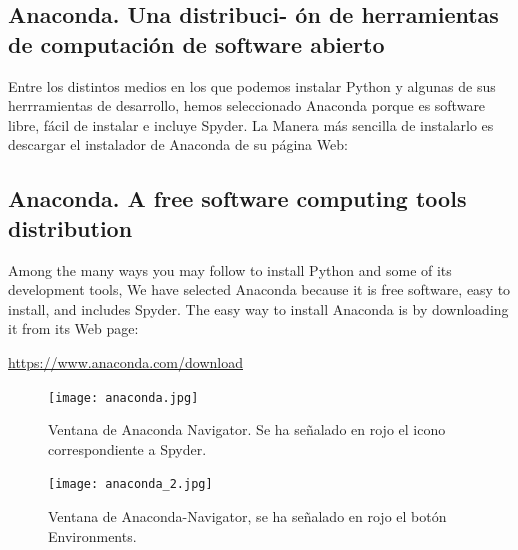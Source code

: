 \begin{paracol}{2}
\subsection{Anaconda. Una distribuci- ón de herramientas de com\-putación de software abierto}
Entre los distintos medios en los que podemos instalar Python y algunas de sus herrramientas de desarrollo, hemos seleccionado Anaconda porque es software libre, fácil de instalar e incluye Spyder. La Manera más sencilla de instalarlo es descargar el instalador de Anaconda de su página Web: 
\switchcolumn
\subsection{Anaconda. A free software computing tools distribution}
Among the many ways you may follow to install Python and some of its development tools, We have selected Anaconda because it is free software, easy to install, and includes Spyder. The easy way to install Anaconda is by downloading it from its Web page:  
\end{paracol}
\begin{center}
    \hyperlink{https://www.anaconda.com/download}{https://www.anaconda.com/download}
\end{center}

\begin{figure}[h]
    \centering
    \texttt{[image: anaconda.jpg]}
    \caption{Ventana de Anaconda Navigator. Se ha señalado en rojo el icono correspondiente a Spyder.}
    \label{fig:anaconda}
\end{figure} 
\begin{figure}
    \centering
    \texttt{[image: anaconda\_2.jpg]}
    \caption{Ventana de Anaconda-Navigator, se ha señalado en rojo el botón Environments.}
    \label{fig:anaconda2}
\end{figure}

